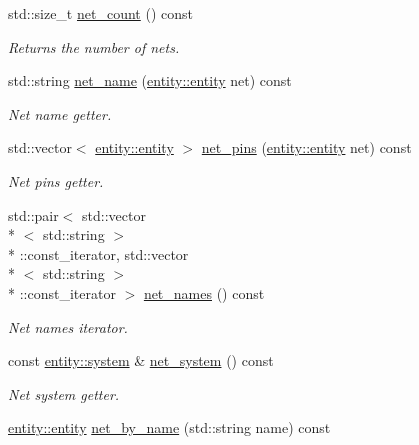 \begin{DoxyCompactItemize}
std\-::size\-\_\-t \hyperlink{classophidian_1_1netlist_1_1netlist_a30f3c26fbf0bd3ca1686aa0bc6f72314}{net\-\_\-count} () const 
\begin{DoxyCompactList}\small\item\em Returns the number of nets. \end{DoxyCompactList}\item 
std\-::string \hyperlink{classophidian_1_1netlist_1_1netlist_a404d23a09954f6f9980b3488fa9a08b6}{net\-\_\-name} (\hyperlink{classophidian_1_1entity_1_1entity}{entity\-::entity} net) const 
\begin{DoxyCompactList}\small\item\em Net name getter. \end{DoxyCompactList}\item 
std\-::vector$<$ \hyperlink{classophidian_1_1entity_1_1entity}{entity\-::entity} $>$ \hyperlink{classophidian_1_1netlist_1_1netlist_ac40def6c00adecd32c514b4c53d36e4a}{net\-\_\-pins} (\hyperlink{classophidian_1_1entity_1_1entity}{entity\-::entity} net) const 
\begin{DoxyCompactList}\small\item\em Net pins getter. \end{DoxyCompactList}\item 
std\-::pair$<$ std\-::vector\\*
$<$ std\-::string $>$\\*
\-::const\-\_\-iterator, std\-::vector\\*
$<$ std\-::string $>$\\*
\-::const\-\_\-iterator $>$ \hyperlink{classophidian_1_1netlist_1_1netlist_a3aad34720cad4872b7a0d2df5575689f}{net\-\_\-names} () const 
\begin{DoxyCompactList}\small\item\em Net names iterator. \end{DoxyCompactList}\item 
const \hyperlink{classophidian_1_1entity_1_1system}{entity\-::system} \& \hyperlink{classophidian_1_1netlist_1_1netlist_ab60dc6b6e588ce1f73e09c2e99085b46}{net\-\_\-system} () const 
\begin{DoxyCompactList}\small\item\em Net system getter. \end{DoxyCompactList}\item 
\hyperlink{classophidian_1_1entity_1_1entity}{entity\-::entity} \hyperlink{classophidian_1_1netlist_1_1netlist_a3544a02afaf5cc68dc5fe56c57ebd47e}{net\-\_\-by\-\_\-name} (std\-::string name) const 

\end{DoxyCompactItemize}
